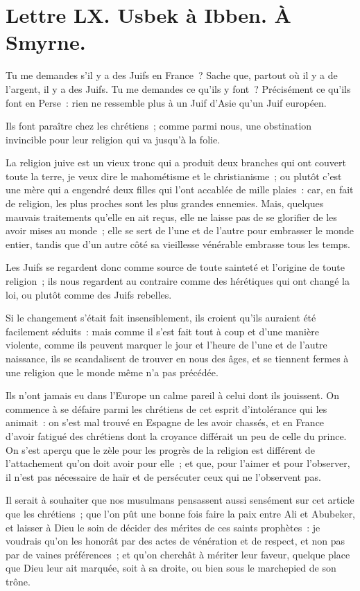 \documentclass[french,twoside]{book} %
\newcommand{\dateline}[1]{\medskip{\RaggedLeft{#1}\par}\bigskip}
\begin{document}
\dateline{De Paris, le 14 de la lune de Saphar, 1714.}
\section[{Lettre LX. Usbek à Ibben. À Smyrne.}]{Lettre LX. Usbek à Ibben. À Smyrne.}\renewcommand{\leftmark}{Lettre LX. Usbek à Ibben. À Smyrne.}

\noindent Tu me demandes s’il y a des Juifs en France ? Sache que, partout où il y a de l’argent, il y a des Juifs. Tu me demandes ce qu’ils y font ? Précisément ce qu’ils font en Perse : rien ne ressemble plus à un Juif d’Asie qu’un Juif européen.\par
Ils font paraître chez les chrétiens ; comme parmi nous, une obstination invincible pour leur religion qui va jusqu’à la folie.\par
La religion juive est un vieux tronc qui a produit deux branches qui ont couvert toute la terre, je veux dire le mahométisme et le christianisme ; ou plutôt c’est une mère qui a engendré deux filles qui l’ont accablée de mille plaies : car, en fait de religion, les plus proches sont les plus grandes ennemies. Mais, quelques mauvais traitements qu’elle en ait reçus, elle ne laisse pas de se glorifier de les avoir mises au monde ; elle se sert de l’une et de l’autre pour embrasser le monde entier, tandis que d’un autre côté sa vieillesse vénérable embrasse tous les temps.\par
Les Juifs se regardent donc comme source de toute sainteté et l’origine de toute religion ; ils nous regardent au contraire comme des hérétiques qui ont changé la loi, ou plutôt comme des Juifs rebelles.\par
Si le changement s’était fait insensiblement, ils croient qu’ils auraient été facilement séduits : mais comme il s’est fait tout à coup et d’une manière violente, comme ils peuvent marquer le jour et l’heure de l’une et de l’autre naissance, ils se scandalisent de trouver en nous des âges, et se tiennent fermes à une religion que le monde même n’a pas précédée.\par
Ils n’ont jamais eu dans l’Europe un calme pareil à celui dont ils jouissent. On commence à se défaire parmi les chrétiens de cet esprit d’intolérance qui les animait : on s’est mal trouvé en Espagne de les avoir chassés, et en France d’avoir fatigué des chrétiens dont la croyance différait un peu de celle du prince. On s’est aperçu que le zèle pour les progrès de la religion est différent de l’attachement qu’on doit avoir pour elle ; et que, pour l’aimer et pour l’observer, il n’est pas nécessaire de haïr et de persécuter ceux qui ne l’observent pas.\par
Il serait à souhaiter que nos musulmans pensassent aussi sensément sur cet article que les chrétiens ; que l’on pût une bonne fois faire la paix entre Ali et Abubeker, et laisser à Dieu le soin de décider des mérites de ces saints prophètes : je voudrais qu’on les honorât par des actes de vénération et de respect, et non pas par de vaines préférences ; et qu’on cherchât à mériter leur faveur, quelque place que Dieu leur ait marquée, soit à sa droite, ou bien sous le marchepied de son trône.\par
\end{document}
